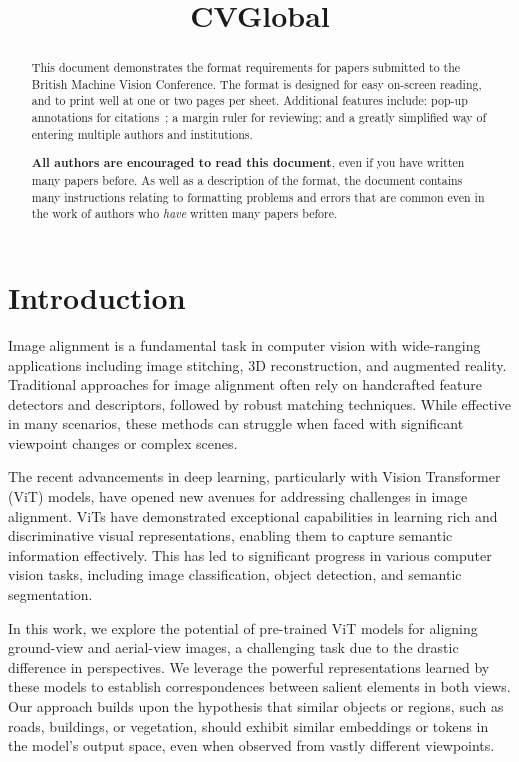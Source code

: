 \documentclass{bmvc2k}
\title{CVGlobal}
\begin{document}
\maketitle

\begin{abstract}
This document demonstrates the format requirements for papers submitted
to the British Machine Vision Conference.  The format is designed for
easy on-screen reading, and to print well at one or two pages per sheet.
Additional features include: pop-up annotations for
citations~\cite{Authors06,Mermin89}; a margin ruler for reviewing; and a
greatly simplified way of entering multiple authors and institutions.

{\bf All authors are encouraged to read this document}, even if you have
written many papers before.  As well as a description of the format, the
document contains many instructions relating to formatting problems and
errors that are common even in the work of authors who {\em have}
written many papers before.
\end{abstract}

\section{Introduction}
\label{sec:intro}

Image alignment is a fundamental task in computer vision with wide-ranging applications including image stitching, 3D reconstruction, and augmented reality. Traditional approaches for image alignment often rely on handcrafted feature detectors and descriptors, followed by robust matching techniques. While effective in many scenarios, these methods can struggle when faced with significant viewpoint changes or complex scenes. 

The recent advancements in deep learning, particularly with Vision Transformer (ViT) models, have opened new avenues for addressing challenges in image alignment. ViTs have demonstrated exceptional capabilities in learning rich and discriminative visual representations, enabling them to capture semantic information effectively. This has led to significant progress in various computer vision tasks, including image classification, object detection, and semantic segmentation. 

In this work, we explore the potential of pre-trained ViT models for aligning ground-view and aerial-view images, a challenging task due to the drastic difference in perspectives. We leverage the powerful representations learned by these models to establish correspondences between salient elements in both views. Our approach builds upon the hypothesis that similar objects or regions, such as roads, buildings, or vegetation, should exhibit similar embeddings or tokens in the model's output space, even when observed from vastly different viewpoints.
\end{document}
